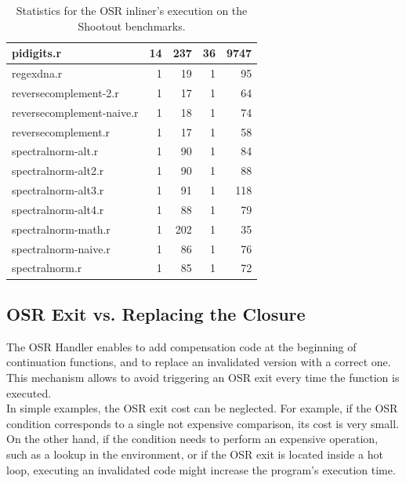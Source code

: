 \begin{table}[h!]
{\begin{tabular}{|l|r|r|r|r|}
pidigits.r & 14 & 237 & 36 & 9747\\ \hline
regexdna.r & 1 & 19 & 1 & 95\\ \hline
reversecomplement-2.r & 1 & 17 & 1 & 64\\ \hline
reversecomplement-naive.r  & 1 & 18 & 1 & 74\\ \hline
reversecomplement.r & 1 & 17 & 1 & 58\\ \hline
spectralnorm-alt.r  & 1 & 90 & 1 & 84\\ \hline
spectralnorm-alt2.r & 1 & 90 & 1 & 88\\ \hline
spectralnorm-alt3.r & 1 & 91 & 1 & 118\\ \hline
spectralnorm-alt4.r & 1 & 88 & 1 & 79\\ \hline
spectralnorm-math.r & 1 & 202 & 1 & 35\\ \hline
spectralnorm-naive.r & 1 & 86 & 1 & 76\\ \hline
spectralnorm.r & 1 & 85 & 1 & 72\\ \hline

\end{tabular}}%
\caption{Statistics for the OSR inliner's execution on the Shootout benchmarks.}
\label{tab:statsinliner}
\end{table}
\clearpage



\subsection{OSR Exit vs. Replacing the Closure}\label{section:osrexitsvsreplacing}
The OSR Handler enables to add compensation code at the beginning of continuation functions, and to replace an invalidated version with a correct one.
This mechanism allows to avoid triggering an OSR exit every time the function is executed.\\

In simple examples, the OSR exit cost can be neglected.
For example, if the OSR condition corresponds to a single not expensive comparison, its cost is very small.
On the other hand, if the condition needs to perform an expensive operation, such as a lookup in the environment, or if the OSR exit is located inside a hot loop, executing an invalidated code might increase the program's execution time.\\

